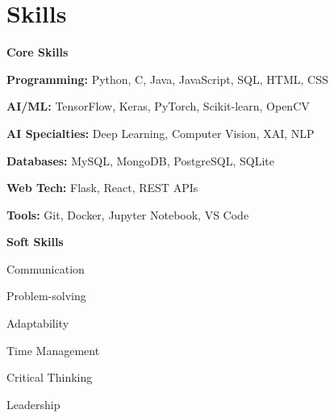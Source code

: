 \documentclass[letterpaper,11pt]{article}
\begin{document}
\section{Skills}
  \vspace{-2pt} %
  \noindent
  \begin{minipage}[t]{0.65\textwidth}
    \textbf{Core Skills}
    \vspace{-1pt} %
    \begin{itemize}[leftmargin=*, nosep, topsep=0pt, itemsep=-1pt] %
      \small{
        \item \textbf{Programming:} Python, C, Java, JavaScript, SQL, HTML, CSS
        \item \textbf{AI/ML:} TensorFlow, Keras, PyTorch, Scikit-learn, OpenCV
        \item \textbf{AI Specialties:} Deep Learning, Computer Vision, XAI, NLP
        \item \textbf{Databases:} MySQL, MongoDB, PostgreSQL, SQLite
        \item \textbf{Web Tech:} Flask, React, REST APIs
        \item \textbf{Tools:} Git, Docker, Jupyter Notebook, VS Code
      }
    \end{itemize}
  \end{minipage}
  \hfill
  \begin{minipage}[t]{0.32\textwidth}
    \textbf{Soft Skills}
    \vspace{-1pt} %
    \begin{itemize}[leftmargin=*, nosep, topsep=0pt, itemsep=-1pt] %
      \small{
        \item Communication
        \item Problem-solving
        \item Adaptability
        \item Time Management
        \item Critical Thinking
        \item Leadership
      }
    \end{itemize}
  \end{minipage}



\end{document}
